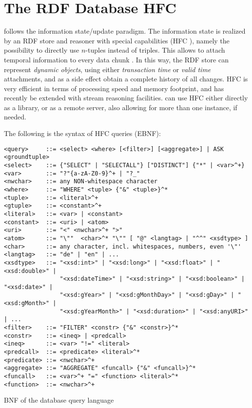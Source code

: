 \section{The RDF Database HFC} \label{sec:hfc}

\vonda follows the information state/update paradigm. The information state is
realized by an RDF store and reasoner with special capabilities
(HFC \cite{krieger2013efficient}), namely the
possibility to directly use $n$-tuples instead of triples. This allows to
attach temporal information to every data chunk \cite{Krieger:FOIS2012,
  krieger2014detailed}. In this way, the RDF store can represent \emph{dynamic
  objects}, using either \emph{transaction time} or \emph{valid time}
attachments, and as a side effect obtain a complete history of all changes.
HFC is very efficient in terms of processing speed and memory footprint, and
has recently be extended with stream reasoning facilities. \vonda can use HFC
either directly as a library, or as a remote server, also allowing for more
than one instance, if needed.

The following is the syntax of HFC queries (EBNF):
\begin{table}[htbp]
  \centering\small
\begin{verbatim}
<query>     ::= <select> <where> [<filter>] [<aggregate>] | ASK <groundtuple>
<select>    ::= {"SELECT" | "SELECTALL"} ["DISTINCT"] {"*" | <var>^+}
<var>       ::= "?"{a-zA-Z0-9}^+ | "?_"
<nwchar>    ::= any NON-whitespace character
<where>     ::= "WHERE" <tuple> {"&" <tuple>}^*
<tuple>     ::= <literal>^+
<gtuple>    ::= <constant>^+
<literal>   ::= <var> | <constant>
<constant>  ::= <uri> | <atom>
<uri>       ::= "<" <nwchar>^+ ">"
<atom>      ::= "\""  <char>^* "\"" [ "@" <langtag> | "^^" <xsdtype> ]
<char>      ::= any character, incl. whitespaces, numbers, even '\"'
<langtag>   ::= "de" | "en" | ...
<xsdtype>   ::= "<xsd:int>" | "<xsd:long>" | "<xsd:float>" | "<xsd:double>" |
                "<xsd:dateTime>" | "<xsd:string>" | "<xsd:boolean>" | "<xsd:date>" |
                "<xsd:gYear>" | "<xsd:gMonthDay>" | "<xsd:gDay>" | "<xsd:gMonth>" |
                "<xsd:gYearMonth>" | "<xsd:duration>" | "<xsd:anyURI>" | ...
<filter>    ::= "FILTER" <constr> {"&" <constr>}^*
<constr>    ::= <ineq> | <predcall>
<ineq>      ::= <var> "!=" <literal>
<predcall>  ::= <predicate> <literal>^*
<predicate> ::= <nwchar>^+
<aggregate> ::= "AGGREGATE" <funcall> {"&" <funcall>}^*
<funcall>   ::= <var>^+ "=" <function> <literal>^*
<function>  ::= <nwchar>^+
\end{verbatim}
  \caption{BNF of the database query language}
  \label{tab:hfcquerybnf}
\end{table}


